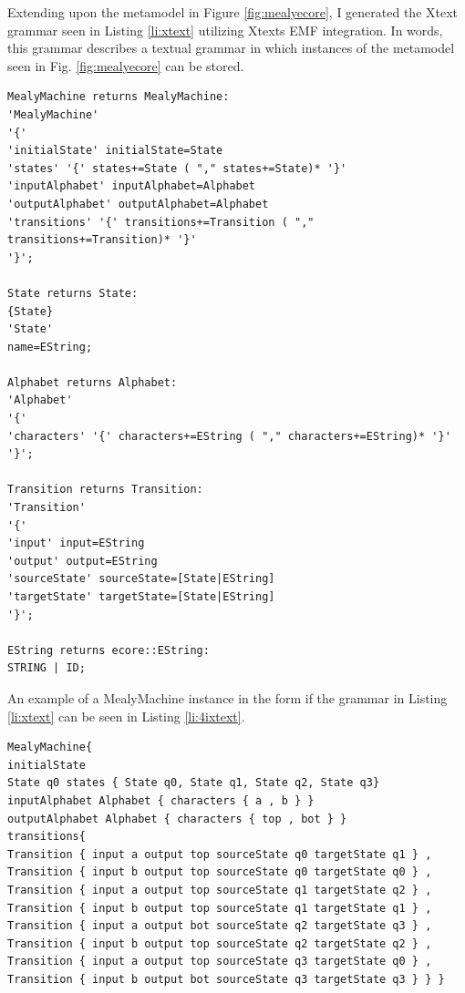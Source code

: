Extending upon the metamodel in Figure \ref{fig:mealyecore}, I generated the Xtext grammar seen in Listing \ref{li:xtext} utilizing Xtexts EMF integration. In words, this  grammar describes a textual grammar in which instances of the metamodel seen in Fig. \ref{fig:mealyecore} can be stored. 



\begin{lstlisting}[caption=Xtext grammar describing Mealy machines.,label=li:xtext,float,floatplacement=H]
MealyMachine returns MealyMachine:
'MealyMachine'
'{'
'initialState' initialState=State
'states' '{' states+=State ( "," states+=State)* '}' 
'inputAlphabet' inputAlphabet=Alphabet
'outputAlphabet' outputAlphabet=Alphabet
'transitions' '{' transitions+=Transition ( "," transitions+=Transition)* '}' 
'}';

State returns State:
{State}
'State'
name=EString;

Alphabet returns Alphabet:
'Alphabet'
'{'
'characters' '{' characters+=EString ( "," characters+=EString)* '}' 
'}';

Transition returns Transition:
'Transition'
'{'
'input' input=EString
'output' output=EString
'sourceState' sourceState=[State|EString]
'targetState' targetState=[State|EString]
'}';

EString returns ecore::EString:
STRING | ID;
\end{lstlisting}

An example of a MealyMachine instance in the form if the grammar in Listing \ref{li:xtext} can be seen in Listing \ref{li:4ixtext}.

\begin{lstlisting}[caption=The Mealy machine seen in Fig.\ref{fig:dfaexamplemealyver}.a in the form of the Xtext grammar described in Listing \ref{li:xtext}.,label=li:4ixtext]
MealyMachine{
initialState 
State q0 states { State q0, State q1, State q2, State q3}
inputAlphabet Alphabet { characters { a , b } }
outputAlphabet Alphabet { characters { top , bot } }
transitions{ 
Transition { input a output top sourceState q0 targetState q1 } , 
Transition { input b output top sourceState q0 targetState q0 } , 
Transition { input a output top sourceState q1 targetState q2 } , 
Transition { input b output top sourceState q1 targetState q1 } , 
Transition { input a output bot sourceState q2 targetState q3 } , 
Transition { input b output top sourceState q2 targetState q2 } , 
Transition { input a output top sourceState q3 targetState q0 } , 
Transition { input b output bot sourceState q3 targetState q3 } } }
\end{lstlisting}


